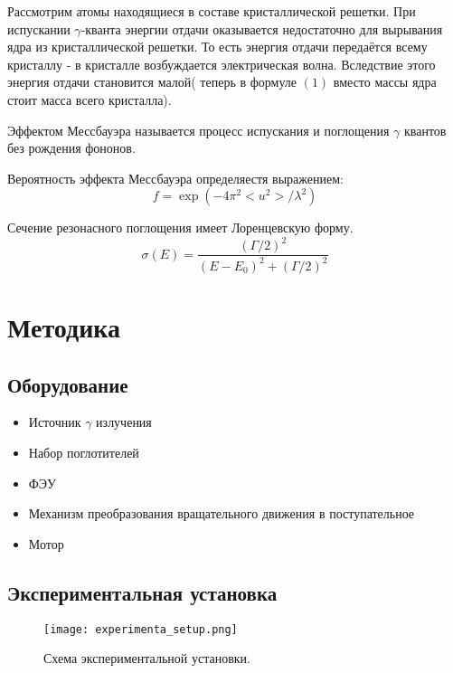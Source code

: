 \documentclass[a4paper, 14pt]{article}
\begin{document}
Рассмотрим атомы находящиеся в составе кристаллической решетки. 
При испускании $\gamma$-кванта энергии отдачи оказывается недостаточно
для вырывания ядра из кристаллической решетки. То есть энергия отдачи 
передаётся всему кристаллу - в кристалле возбуждается электрическая волна.
Вследствие этого энергия отдачи становится малой( теперь в формуле $(1)$ 
вместо массы ядра стоит масса всего кристалла).

\textcolor{defenition}{Эффектом Мессбауэра} называется процесс испускания 
и поглощения $\gamma$ квантов без рождения фононов. 

Вероятность эффекта Мессбауэра определяестя выражением:
\begin{equation}
f = \operatorname{exp}(-4 \pi^{2} <u^{2}> / \lambda^{2})
\end{equation}

Сечение резонасного поглощения имеет Лоренцевскую форму.
\begin{equation}
    \sigma(E) = \frac{(\Gamma / 2)^{2}}{(E - E_{0})^{2} + (\Gamma / 2)^{2}}
    \label{lorenz}
\end{equation}

\section*{\textcolor{header}{Методика}}
\subsection*{\textcolor{sub_header}{Оборудование}}
\begin{itemize}
    \item Источник $\gamma$ излучения
    \item Набор поглотителей
    \item ФЭУ 
    \item Механизм преобразования вращательного движения в поступательное
    \item Мотор
\end{itemize}

\subsection*{\textcolor{sub_header}{Экспериментальная установка}}

\begin{figure}[hbtp]
    \begin{center}
        \texttt{[image: experimenta\_setup.png]}
        \caption{Схема экспериментальной установки.}
        \label{fig:experimental_setup}
    \end{center}
\end{figure}
\end{document}
